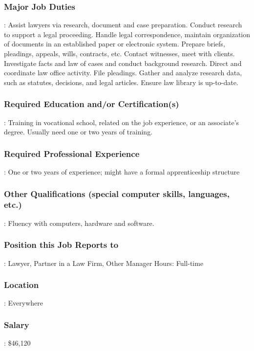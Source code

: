 \subsubsection*{Major Job Duties}: Assist lawyers via research, document and case preparation. Conduct research to support a legal proceeding. Handle legal correspondence, maintain organization of documents in an established paper or electronic system. Prepare briefs, pleadings, appeals, wills, contracts, etc. Contact witnesses, meet with clients. Investigate facts and law of cases and conduct background research. Direct and coordinate law office activity. File pleadings. Gather and analyze research data, such as statutes, decisions, and legal articles. Ensure law library is up-to-date.

\subsubsection*{Required Education and/or Certification(s)}: Training in vocational school, related on the job experience, or an associate's degree. Usually need one or two years of training.

\subsubsection*{Required Professional Experience}: One or two years of experience; might have a formal apprenticeship structure

\subsubsection*{Other Qualifications (special computer skills, languages, etc.)}: Fluency with computers, hardware and software.

\subsubsection*{Position this Job Reports to}: Lawyer, Partner in a Law Firm, Other Manager Hours: Full-time

\subsubsection*{Location}: Everywhere

\subsubsection*{Salary}: \$46,120

